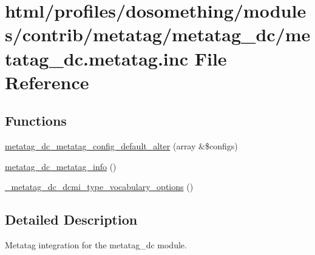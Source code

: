 \hypertarget{metatag__dc_8metatag_8inc}{
\section{html/profiles/dosomething/modules/contrib/metatag/metatag\_\-dc/metatag\_\-dc.metatag.inc File Reference}
\label{metatag__dc_8metatag_8inc}
}
\subsection*{Functions}
\begin{DoxyCompactItemize}
\item 
\hyperlink{metatag__dc_8metatag_8inc_ace253be8e874772b4405cf633c1e6ec8}{metatag\_\-dc\_\-metatag\_\-config\_\-default\_\-alter} (array \&\$configs)
\item 
\hyperlink{metatag__dc_8metatag_8inc_adce300d61c1ae365a1ded27caee47c30}{metatag\_\-dc\_\-metatag\_\-info} ()
\item 
\hyperlink{metatag__dc_8metatag_8inc_a45c2c896b1c8e906f978c6f3969238a5}{\_\-metatag\_\-dc\_\-dcmi\_\-type\_\-vocabulary\_\-options} ()
\end{DoxyCompactItemize}


\subsection{Detailed Description}
Metatag integration for the metatag\_\-dc module. 

